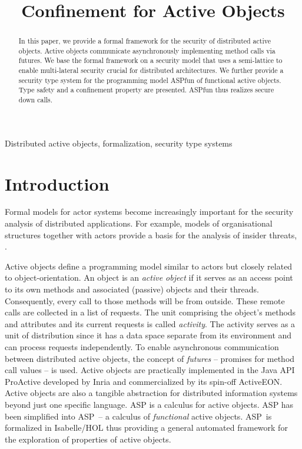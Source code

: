 \documentclass[10pt, conference, compsocconf]{IEEEtran}
\newcommand\aspfun{ASP\ }
\begin{document}
\title{Confinement for Active Objects}
\author{
}
\maketitle
\thispagestyle{empty}

\begin{abstract}
In this paper, we provide a formal framework for the security of distributed active objects.
Active objects communicate asynchronously implementing method calls via futures.
We base the formal framework on a security model that uses a semi-lattice to enable
multi-lateral security crucial for distributed architectures.
We further provide a security type system for the programming model ASPfun of 
functional active objects.
Type safety and a confinement property are presented. ASPfun thus realizes secure down calls.
\end{abstract}
\begin{keywords} 
Distributed active objects, formalization, security type systems
\end{keywords} 
\section{Introduction}
\label{sec:intro}
Formal models for actor systems become increasingly important  for the security
analysis of distributed applications.
For example, models of organisational structures together with actors provide a basis
for the analysis of insider threats, \cite{Probst:2008:EAS:1480242.1480308,Probst.311.1}.

Active objects define a programming model similar to actors \cite{Agha:92}
but closely related to object-orientation.  An object is an {\it active object} if 
it serves as an access point to its own methods and associated (passive) objects and their 
threads.  Consequently, every call
to those methods will be from outside. These remote calls are collected in a list of requests.
The unit comprising the object's methods and attributes and its current requests is 
called {\it activity}.
The activity serves as a unit of distribution since it has a data space separate from its environment 
and can process requests independently.
To enable asynchronous communication between distributed active objects, the concept of 
{\it futures} -- promises for method call values -- is used.
Active objects are practically implemented in the Java API ProActive \cite{CDD:CMST06}
developed by Inria and commercialized by its spin-off ActiveEON.
Active objects are also a tangible abstraction for distributed information systems beyond just
one specific language.
ASP \cite{CHSPOPL04} is a calculus for active objects. 
ASP has been simplified into \aspfun --
a calculus of {\it functional} active objects. \aspfun is formalized
in Isabelle/HOL \cite{hkl:11} thus providing a general automated framework for 
the exploration of properties of active objects.
\end{document}
